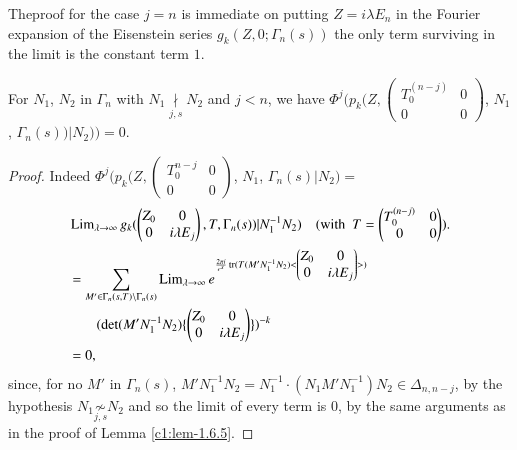 The\pageoriginale proof for the case $j=n$ is immediate on putting
$Z=i\lambda E_{n}$ in the Fourier expansion of the Eisenstein series
$g_{k}(Z,0;\Gamma_{n}(s))$ the only term surviving in the limit is the
constant term $1$.

\begin{sublemma}\label{c1:lem-1.6.6}
For $N_{1}$, $N_{2}$ in $\Gamma_{n}$ with
$N_{1}\mathop{\nmid}\limits_{j,s}N_{2}$ and $j<n$, we have
$\Phi^{j}(p_{k}(Z,
\left(\begin{smallmatrix} T_{0}^{(n-j)} & 0\\ 0 & 0
\end{smallmatrix}\right)$, $N_{1}$, $\Gamma_{n}(s))|N_{2}))=0$.
\end{sublemma}

\begin{proof}
Indeed $\Phi^{j}(p_{k}(Z,\left(\begin{smallmatrix} T^{n-j}_{0} & 0\\ 0
  & 0\end{smallmatrix}\right)$, $N_{1}$, $\Gamma_{n}(s)|N_{2})=$
\begin{align*}
& \operatorname{Lim}\limits_{\lambda\to \infty}g_{k}(
\begin{pmatrix}
Z_{0} & 0\\
0 & i\lambda E_{j}
\end{pmatrix}, T,\Gamma_{n}(s))|N^{-1}_{1}N_{2})\quad (\text{with \ }
T=
\begin{pmatrix} 
T^{(n-j)}_{0} & 0\\
0 & 0
\end{pmatrix}).\\
&= \sum_{M'\in\Gamma_{n}(s,T)\backslash
  \Gamma_{n}(s)}\operatorname{Lim}\limits_{\lambda\to \infty}e^{\frac{2\pi
    i}{e^{s}}\operatorname{tr}(T(M'N^{-1}_{1}N_{2})<
\begin{pmatrix}
Z_{0} & 0\\
0 & i\lambda E_{j}
\end{pmatrix}
>)}\\
&\qquad(\det (M'N^{-1}_{1}N_{2})\{
\begin{pmatrix}
Z_{0} & 0\\
0 & i\lambda E_{j}
\end{pmatrix}
\})^{-k}\\
&=0,
\end{align*}
since, for no $M'$ in $\Gamma_{n}(s)$,
$M'N^{-1}_{1}N_{2}=N^{-1}_{1}\cdot
(N_{1}M'N^{-1}_{1})N_{2}\in\Delta_{n,n-j}$, by the hypothesis
$N_{1}\mathop{\not\sim}\limits_{j,s}N_{2}$ and so the limit of every
term is $0$, by the same arguments as in the proof of Lemma
\ref{c1:lem-1.6.5}.
\end{proof}

